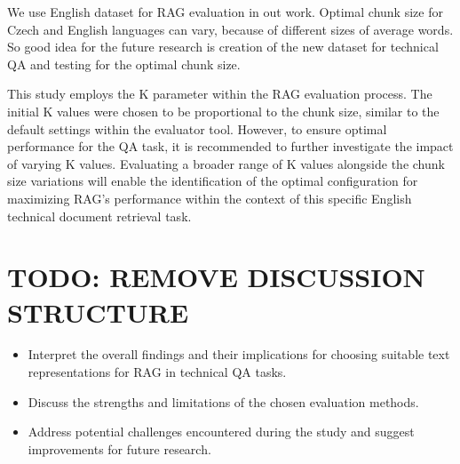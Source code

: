 We use English dataset for \ac{RAG}  evaluation in out work.
Optimal chunk size for Czech and English languages can vary, because of different sizes of average words. 
So good idea for the future research is creation of the new dataset for technical \ac{QA} and testing for the optimal chunk size.

This study employs the K parameter within the \ac{RAG} evaluation process.
The initial K values were chosen to be proportional to the chunk size, similar to the default settings within the evaluator tool.
However, to ensure optimal performance for the \ac{QA} task, it is recommended to further investigate the impact of varying K values.
Evaluating a broader range of K values alongside the chunk size variations will enable the identification of the optimal configuration for maximizing RAG's performance within the context of this specific English technical document retrieval task.

\section{TODO: REMOVE DISCUSSION STRUCTURE}
\begin{itemize}
    \item Interpret the overall findings and their implications for choosing suitable text representations for RAG in technical QA tasks.
    \item Discuss the strengths and limitations of the chosen evaluation methods.
    \item Address potential challenges encountered during the study and suggest improvements for future research.
\end{itemize}





